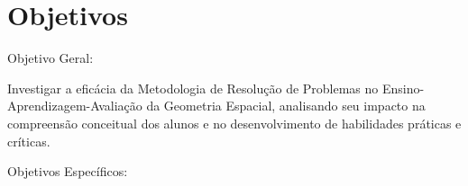\section{Objetivos}

Objetivo Geral:

Investigar a eficácia da Metodologia de Resolução de Problemas no Ensino-Aprendizagem-Avaliação da Geometria Espacial, analisando seu impacto na compreensão conceitual dos alunos e no desenvolvimento de habilidades práticas e críticas.

Objetivos Específicos:

\begin{enumerate}


\end{enumerate}
